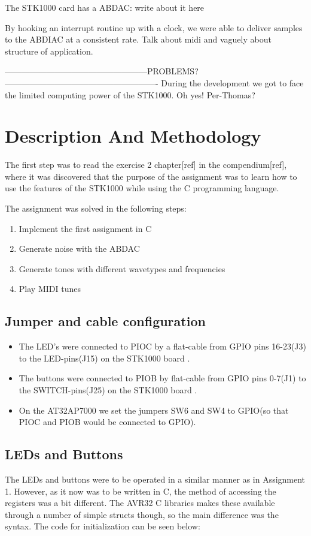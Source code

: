 \documentclass[a4paper,12pt]{article}
\begin{document}
The STK1000 card has a ABDAC: write about it here \thiswillgivelatexerror

By hooking an interrupt routine up with a clock, we were able to deliver samples to the ABDIAC at a consistent rate.
Talk about midi and vaguely about structure of application.

---------------------------------------------------PROBLEMS?-------------------------------------------------------
During the development we got to face the limited computing power of the STK1000.
Oh yes! Per-Thomas?

\clearpage
\section{Description And Methodology}

The first step was to read the exercise 2 chapter[ref] in the compendium[ref], where it was discovered that the purpose of the assignment was to learn how to use the features of the STK1000 while using the C programming language.

The assignment was solved in the following steps:
\begin{enumerate}
\item Implement the first assignment in C
\item Generate noise with the ABDAC
\item Generate tones with different wavetypes and frequencies
\item Play MIDI tunes
\end{enumerate} 

\subsection{Jumper and cable configuration}
\begin{itemize}
\item The LED’s were connected to PIOC by a flat-cable from GPIO pins 16-23(J3) to the LED-pins(J15) on the STK1000 board \cite[section~2.4.1]{compendium}.
\item The buttons were connected to PIOB by flat-cable from GPIO pins 0-7(J1) to the SWITCH-pins(J25) on the STK1000 board \cite[section~2.4.1]{compendium}.
\item On the AT32AP7000 we set the jumpers SW6 and SW4 to GPIO(so that PIOC and PIOB would be connected to GPIO)\cite[table~2.3]{compendium}.
\end{itemize}

\subsection{LEDs and Buttons}
The LEDs and buttons were to be operated in a similar manner as in Assignment 1. However, as it now was to be written in C, the method of accessing the registers was a bit different. The AVR32 C libraries makes these available through a number of simple structs though, so the main difference was the syntax. The code for initialization can be seen below:
\end{document}
